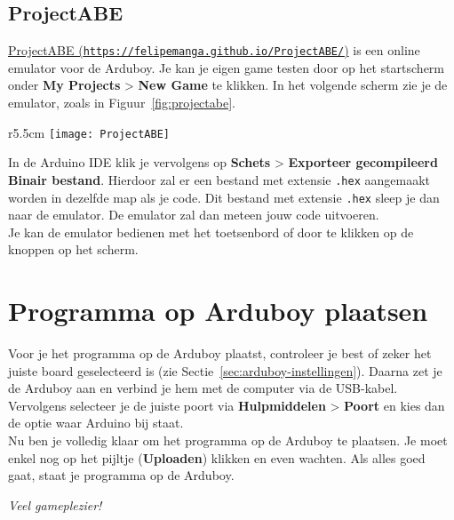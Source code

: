 \documentclass[11pt,fleqn]{book} %
\begin{document}
\subsection{ProjectABE}
\href{https://felipemanga.github.io/ProjectABE/}{ProjectABE (\texttt{https://felipemanga.github.io/ProjectABE/})} is een online emulator voor de Arduboy.
Je kan je eigen game testen door op het startscherm onder \textbf{My Projects} > \textbf{New Game} te klikken. In het volgende scherm zie je de emulator, zoals in Figuur~\ref{fig:projectabe}.
\begin{wrapfigure}{r}{5.5cm}
	\centering
	\texttt{[image: ProjectABE]}
	\caption{Project ABE}
	\label{fig:projectabe}
\end{wrapfigure}
In de Arduino IDE klik je vervolgens op \textbf{Schets} > \textbf{Exporteer gecompileerd Binair bestand}. Hierdoor zal er een bestand met extensie \texttt{.hex} aangemaakt worden in dezelfde map als je code. Dit bestand met extensie \texttt{.hex} sleep je dan naar de emulator. De emulator zal dan meteen jouw code uitvoeren.\\
Je kan de emulator bedienen met het toetsenbord of door te klikken op de knoppen op het scherm.

\section{Programma op Arduboy plaatsen}
Voor je het programma op de Arduboy plaatst, controleer je best of zeker het juiste board geselecteerd is (zie Sectie~\ref{sec:arduboy-instellingen}). Daarna zet je de Arduboy aan en verbind je hem met de computer via de USB-kabel. Vervolgens selecteer je de juiste poort via \textbf{Hulpmiddelen} > \textbf{Poort} en kies dan de optie waar Arduino bij staat.\\
Nu ben je volledig klaar om het programma op de Arduboy te plaatsen. Je moet enkel nog op het pijltje (\textbf{Uploaden}) klikken en even wachten. Als alles goed gaat, staat je programma op de Arduboy.

\vspace{1cm}

\noindent
\emph{Veel gameplezier!}



\end{document}
